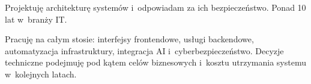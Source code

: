 
\begin{cvparagraph}
Projektuję architekturę systemów i~odpowiadam za ich bezpieczeństwo. Ponad 10 lat w~branży IT.

Pracuję na całym stosie: interfejsy frontendowe, usługi backendowe, automatyzacja infrastruktury, integracja AI i~cyberbezpieczeństwo. Decyzje techniczne podejmuję pod kątem celów biznesowych i~kosztu utrzymania systemu w~kolejnych latach.
\end{cvparagraph}
